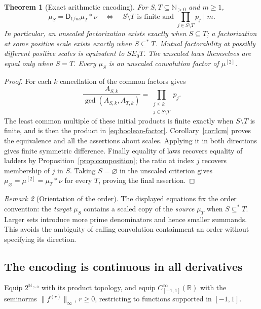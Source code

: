 \documentclass[11pt,a4paper]{article}
\newtheorem{theorem}{Theorem}[section]
\theoremstyle{definition}
\theoremstyle{remark}
\newtheorem{remark}[theorem]{Remark}
\newcommand{\R}{\mathbb R}
\newcommand{\N}{\mathbb N}
\newcommand{\D}{\mathsf D}
\newcommand{\Mu}[1]{\mu^{[#1]}}
\begin{document}
\begin{theorem}[Exact arithmetic encoding]\label{thm:boolean}
For $S,T\subseteq\N_{>0}$ and $m\ge1$,
\begin{equation}\label{eq:boolean-factor}
 \mu_S=\D_{1/m}\mu_T*\nu
 \quad\Longleftrightarrow\quad
 S\setminus T\text{ is finite and }
 \prod_{j\in S\setminus T}p_j\mid m.
\end{equation}
In particular, an unscaled factorization exists exactly when $S\subseteq T$;
a factorization at some positive scale exists exactly when $S\subseteq^*T$.
Mutual factorability at possibly different positive scales is equivalent
to $S\mathrel{E_0}T$. The unscaled laws themselves are equal only when $S=T$.
Every $\mu_S$ is an unscaled convolution factor of $\Mu2$.
\end{theorem}
\begin{proof}
For each $k$ cancellation of the common factors gives
\[
 \frac{A_{S,k}}{\gcd(A_{S,k},A_{T,k})}
 =\prod_{\substack{j\le k\\j\in S\setminus T}}p_j.
\]
The least common multiple of these initial products is finite exactly when
$S\setminus T$ is finite, and is then the product in
\eqref{eq:boolean-factor}. Corollary~\ref{cor:lcm} proves the equivalence
and all the assertions about scales. Applying it in both directions gives
finite symmetric difference. Finally equality of laws recovers equality of
ladders by Proposition~\ref{prop:composition}; the ratio at index $j$
recovers membership of $j$ in $S$. Taking $S=\varnothing$ in the
unscaled criterion gives $\mu_{\varnothing}=\Mu2=\mu_T*\nu$ for
every $T$, proving the final assertion.
\end{proof}

\begin{remark}[Orientation of the order]
The displayed equations fix the order convention: the \emph{target}
$\mu_S$ contains a scaled copy of the \emph{source} $\mu_T$ when
$S\subseteq^*T$. Larger sets introduce more prime denominators and hence
smaller summands. This avoids the ambiguity of calling convolution
containment an order without specifying its direction.
\end{remark}

\subsection{The encoding is continuous in all derivatives}
Equip $2^{\N_{>0}}$ with its product topology, and equip
$C^\infty_{[-1,1]}(\R)$ with the seminorms
$\|f^{(r)}\|_\infty$, $r\ge0$, restricting to functions supported in
$[-1,1]$.
\end{document}
